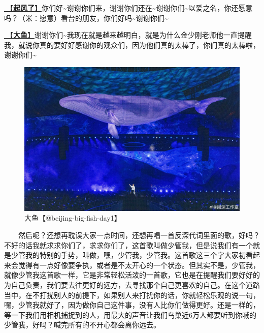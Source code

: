 \documentclass[]{ctexbook}
\begin{document}
\hyperref[the-wind-rises]{🎵【\textbf{起风了}】}你们好\textasciitilde 谢谢你们来，谢谢你们还在\textasciitilde 谢谢你们\textasciitilde 以爱之名，你还愿意吗？（米：愿意）看台的朋友，你们好吗\textasciitilde 谢谢你们\textasciitilde{}

\hyperref[big-fish]{🎵【\textbf{大鱼}】}谢谢你们\textasciitilde 我现在就是越来越明白，就是为什么金少刚老师他一直提醒我，就说你真的要好好感谢你的观众们，因为他们真的太棒了，你们真的太棒啦，谢谢你们\textasciitilde{}

\begin{figure}

{\centering \includegraphics[width=350pt]{img/beijing20240921/big-fish} 

}

\caption{大鱼【@beijing-big-fish-day1】}\label{fig:unnamed-chunk-94}
\end{figure}

  然后呢？还想再耽误大家一点时间，还想再唱一首反深代词里面的歌，好吗？不好的话我就求求你们了，求求你们了，这首歌叫做少管我，但是说我们有一个就是少管我的特别的手势，叫做，嘿，少管我，少管我。这首歌这三个字大家初看起来会觉得有一点好像要争执，或者是不太开心的一个状态。但其实不是，少管我，就像少管我这首歌一样，它是非常轻松活泼的一首歌，它也是在提醒我们要好好的为自己负责，我们要去往更好的远方，去寻找那个自己更喜欢的自己。在这个道路当中，在不打扰别人的前提下，如果别人来打扰你的话，你就轻松乐观的说一句，嘿，少管我就好了，因为做你自己这件事，没有人比你们做得更好。还是一样的，等一下我们用相机捕捉到的人，用最大的声音让我们鸟巢近6万人都要听到你喊的少管我，好吗？喊完所有的不开心都会离你远去。
\end{document}
